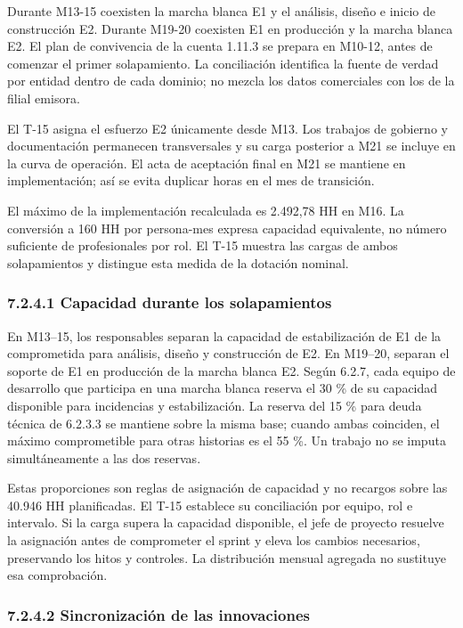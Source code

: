 \documentclass[11pt]{article}
\begin{document}
Durante M13-15 coexisten la marcha blanca E1 y el análisis, diseño e inicio de construcción E2. Durante M19-20 coexisten E1 en producción y la marcha blanca E2. El plan de convivencia de la cuenta 1.11.3 se prepara en M10-12, antes de comenzar el primer solapamiento. La conciliación identifica la fuente de verdad por entidad dentro de cada dominio; no mezcla los datos comerciales con los de la filial emisora.

El T-15 asigna el esfuerzo E2 únicamente desde M13. Los trabajos de gobierno y documentación permanecen transversales y su carga posterior a M21 se incluye en la curva de operación. El acta de aceptación final en M21 se mantiene en implementación; así se evita duplicar horas en el mes de transición.

El máximo de la implementación recalculada es 2.492,78 HH en M16. La conversión a 160 HH por persona-mes expresa capacidad equivalente, no número suficiente de profesionales por rol. El T-15 muestra las cargas de ambos solapamientos y distingue esta medida de la dotación nominal.

\subsubsection{7.2.4.1 Capacidad durante los solapamientos}

En M13–15, los responsables separan la capacidad de estabilización de E1 de la comprometida para análisis, diseño y construcción de E2. En M19–20, separan el soporte de E1 en producción de la marcha blanca E2. Según 6.2.7, cada equipo de desarrollo que participa en una marcha blanca reserva el 30 \% de su capacidad disponible para incidencias y estabilización. La reserva del 15 \% para deuda técnica de 6.2.3.3 se mantiene sobre la misma base; cuando ambas coinciden, el máximo comprometible para otras historias es el 55 \%. Un trabajo no se imputa simultáneamente a las dos reservas.

Estas proporciones son reglas de asignación de capacidad y no recargos sobre las 40.946 HH planificadas. El T-15 establece su conciliación por equipo, rol e intervalo. Si la carga supera la capacidad disponible, el jefe de proyecto resuelve la asignación antes de comprometer el sprint y eleva los cambios necesarios, preservando los hitos y controles. La distribución mensual agregada no sustituye esa comprobación.

\subsubsection{7.2.4.2 Sincronización de las innovaciones}
\end{document}
